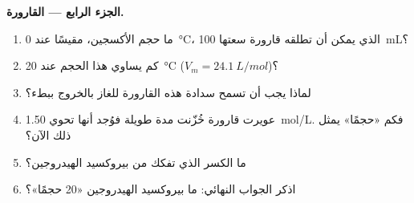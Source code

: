 \begin{problem}
\medskip
\noindent\textbf{الجزء الرابع --- القارورة.}
\begin{enumerate}[resume]
  \item ما حجم الأكسجين، مقيسًا عند \qty{0}{\celsius}، الذي يمكن أن تطلقه
        قارورة سعتها \qty{100}{mL}؟
  \item كم يساوي هذا الحجم عند \qty{20}{\celsius} ($V_m =
        \qty{24.1}{L/mol}$)؟
  \item لماذا يجب أن تسمح سدادة هذه القارورة للغاز بالخروج ببطء؟
  \item عويرت قارورة خُزّنت مدة طويلة فوُجد أنها تحوي
        \qty{1.50}{mol/L}. فكم «حجمًا» يمثل ذلك الآن؟
  \item ما الكسر الذي تفكك من بيروكسيد الهيدروجين؟
  \item اذكر الجواب النهائي: ما   بيروكسيد
        الهيدروجين «20 حجمًا»؟
\end{enumerate}
\end{problem}
